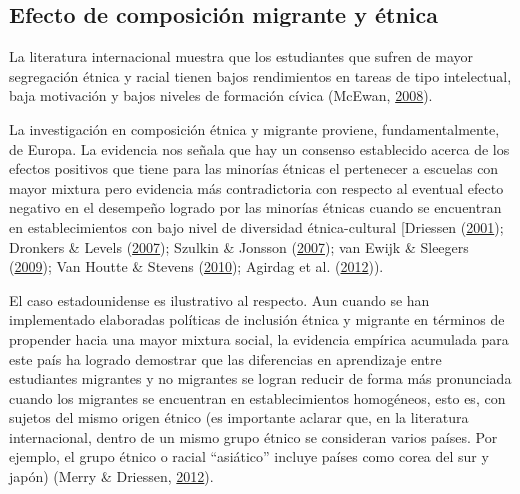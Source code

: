 \documentclass[
]{article}
\begin{document}
\hypertarget{efecto-de-composiciuxf3n-migrante-y-uxe9tnica}{%
\subsection{Efecto de composición migrante y
étnica}\label{efecto-de-composiciuxf3n-migrante-y-uxe9tnica}}

La literatura internacional muestra que los estudiantes que sufren de
mayor segregación étnica y racial tienen bajos rendimientos en tareas de
tipo intelectual, baja motivación y bajos niveles de formación cívica
(McEwan, \protect\hyperlink{ref-mcewan_can_2008}{2008}).

La investigación en composición étnica y migrante proviene,
fundamentalmente, de Europa. La evidencia nos señala que hay un consenso
establecido acerca de los efectos positivos que tiene para las minorías
étnicas el pertenecer a escuelas con mayor mixtura pero evidencia más
contradictoria con respecto al eventual efecto negativo en el desempeño
logrado por las minorías étnicas cuando se encuentran en
establecimientos con bajo nivel de diversidad étnica-cultural
{[}Driessen (\protect\hyperlink{ref-driessen_ethnicity_2001}{2001});
Dronkers \& Levels (\protect\hyperlink{ref-dronkers_school_2007}{2007});
Szulkin \& Jonsson (\protect\hyperlink{ref-szulkin_ethnic_2007}{2007});
van Ewijk \& Sleegers
(\protect\hyperlink{ref-vanewijk_effect_2009}{2009}); Van Houtte \&
Stevens (\protect\hyperlink{ref-vanhoutte_school_2010}{2010}); Agirdag
et al. (\protect\hyperlink{ref-agirdag_why_2012}{2012})).

El caso estadounidense es ilustrativo al respecto. Aun cuando se han
implementado elaboradas políticas de inclusión étnica y migrante en
términos de propender hacia una mayor mixtura social, la evidencia
empírica acumulada para este país ha logrado demostrar que las
diferencias en aprendizaje entre estudiantes migrantes y no migrantes se
logran reducir de forma más pronunciada cuando los migrantes se
encuentran en establecimientos homogéneos, esto es, con sujetos del
mismo origen étnico (es importante aclarar que, en la literatura
internacional, dentro de un mismo grupo étnico se consideran varios
países. Por ejemplo, el grupo étnico o racial ``asiático'' incluye
países como corea del sur y japón) (Merry \& Driessen,
\protect\hyperlink{ref-merry_equality_2012}{2012}).
\end{document}

